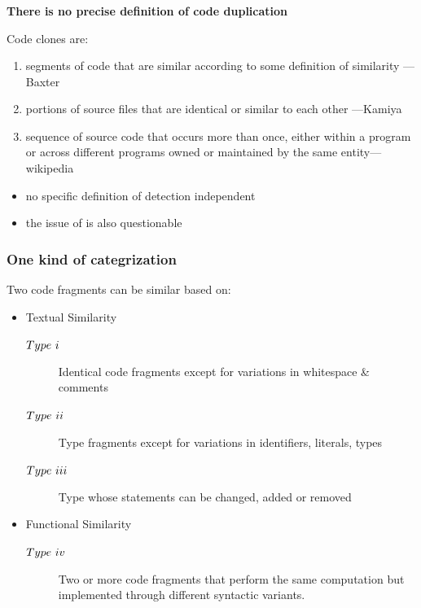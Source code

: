 \documentclass[pdf]{beamer}
\begin{document}
\begin{frame}
\frametitle{\secname}
\textbf{ There is \alert{no} precise definition of code duplication}
\vskip5pt
{
\footnotesize{
\begin{block}{Code clones are:}
\begin{enumerate}
  \item segments of code that are similar according
  to some definition of similarity ---Baxter
  \item portions of source files that are identical or similar to each other
  ---Kamiya
  \item sequence of source code that occurs more than once, either within a
  program or across different programs owned or maintained by the same
  entity---wikipedia
\end{enumerate}
\end{block}}
}
{
\begin{block}{}
\begin{itemize}
  \item no specific definition of detection independent 
  \item the issue of  is also questionable
\end{itemize}
\end{block}
}
\vskip11pt
\end{frame}

\begin{frame}
\frametitle{One kind of categrization}
Two code fragments can be similar based on:
\begin{itemize}
  \item[\ding{43}]Textual Similarity
  \begin{description}
\item[$Type\ \uppercase\expandafter{\romannumeral 1}$]
Identical code fragments except for variations in
{\color{olive}whitespace \& comments}
\item[$Type\ \uppercase\expandafter{\romannumeral 2}$]Type
\uppercase\expandafter{} fragments except for variations in
{\color{olive}identifiers, literals, types}
\item[$Type\ \uppercase\expandafter{\romannumeral
3}$]Type\uppercase\expandafter{} whose statements can be
{\color{olive}changed, added or removed}
\end{description}
\item[\ding{43}]Functional Similarity
\begin{description}
\item[$Type\ \uppercase\expandafter{\romannumeral 4}$]
Two or more code fragments that perform the {\color{olive}same computation} but
implemented through {\color{olive}different syntactic variants}.
\end{description}
\end{itemize}
\end{frame}
\end{document}
